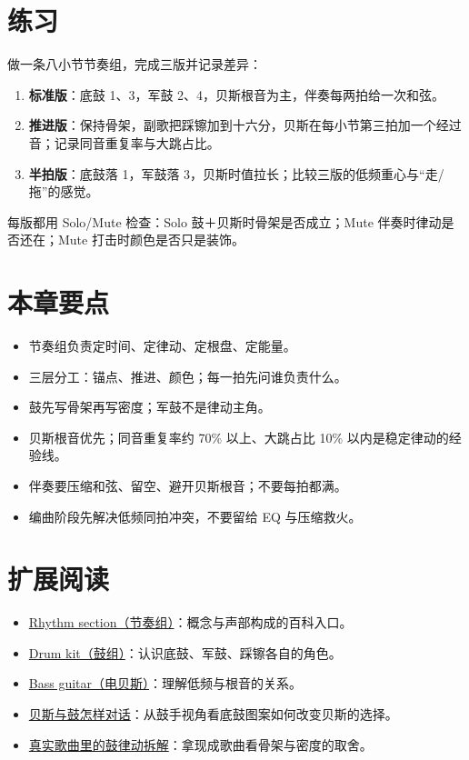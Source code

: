 \section{练习}
\label{sec:rhythm-exercise}

\begin{exercise}
做一条八小节节奏组，完成三版并记录差异：
\begin{enumerate}
\item \textbf{标准版}：底鼓 1、3，军鼓 2、4，贝斯根音为主，伴奏每两拍给一次和弦。
\item \textbf{推进版}：保持骨架，副歌把踩镲加到十六分，贝斯在每小节第三拍加一个经过音；记录同音重复率与大跳占比。
\item \textbf{半拍版}：底鼓落 1，军鼓落 3，贝斯时值拉长；比较三版的低频重心与“走/拖”的感觉。
\end{enumerate}
每版都用 Solo/Mute 检查：Solo 鼓＋贝斯时骨架是否成立；Mute 伴奏时律动是否还在；Mute 打击时颜色是否只是装饰。
\end{exercise}

\section{本章要点}
\label{sec:rhythm-takeaways}

\begin{itemize}
\item 节奏组负责定时间、定律动、定根盘、定能量。
\item 三层分工：锚点、推进、颜色；每一拍先问谁负责什么。
\item 鼓先写骨架再写密度；军鼓不是律动主角。
\item 贝斯根音优先；同音重复率约 70\% 以上、大跳占比 10\% 以内是稳定律动的经验线。
\item 伴奏要压缩和弦、留空、避开贝斯根音；不要每拍都满。
\item 编曲阶段先解决低频同拍冲突，不要留给 EQ 与压缩救火。
\end{itemize}

\section{扩展阅读}
\label{sec:03-rhythm-further-reading}
\begin{itemize}
  \item \href{https://en.wikipedia.org/wiki/Rhythm_section}{Rhythm section（节奏组）}：概念与声部构成的百科入口。
  \item \href{https://en.wikipedia.org/wiki/Drum_kit}{Drum kit（鼓组）}：认识底鼓、军鼓、踩镲各自的角色。
  \item \href{https://en.wikipedia.org/wiki/Bass_guitar}{Bass guitar（电贝斯）}：理解低频与根音的关系。
  \item \href{https://www.youtube.com/watch?v=ewMBhY_6qls}{贝斯与鼓怎样对话}：从鼓手视角看底鼓图案如何改变贝斯的选择。
  \item \href{https://www.youtube.com/watch?v=uO4_OuZHh1Q}{真实歌曲里的鼓律动拆解}：拿现成歌曲看骨架与密度的取舍。
\end{itemize}

